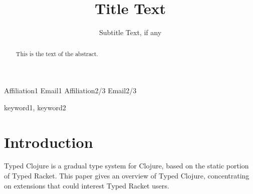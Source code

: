 \documentclass{sigplanconf}
\begin{document}
\setlength{\pdfpageheight}{\paperheight}
\setlength{\pdfpagewidth}{\paperwidth}






\title{Title Text}
\subtitle{Subtitle Text, if any}

           {Affiliation1}
           {Email1}
           {Affiliation2/3}
           {Email2/3}

\maketitle

\begin{abstract}
This is the text of the abstract.
\end{abstract}



\keywords
keyword1, keyword2

\section{Introduction}

Typed Clojure is a gradual type system for Clojure, based on the
static portion of Typed Racket.
This paper gives an overview of Typed Clojure, concentrating on extensions
that could interest Typed Racket users.

\end{document}
